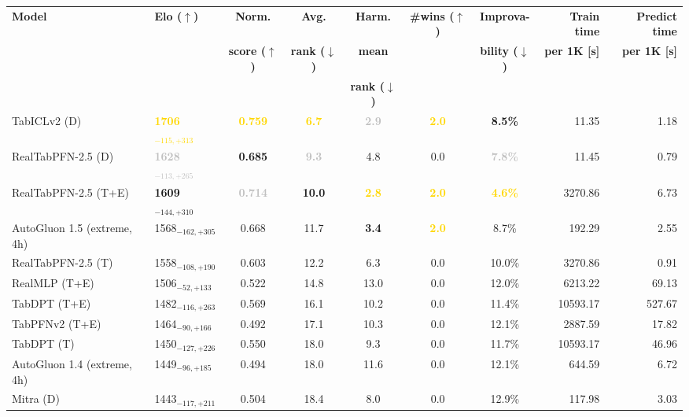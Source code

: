 \begin{tabular}{llcccccrr}
\toprule
\textbf{Model} & \textbf{Elo ($\uparrow$)} & \textbf{Norm.} & \textbf{Avg.} & \textbf{Harm.} & \textbf{\#wins ($\uparrow$)} & \textbf{Improva-} & \textbf{Train time} & \textbf{Predict time} \\
 &  & \textbf{score ($\uparrow$)} & \textbf{rank ($\downarrow$)} & \textbf{mean} &  & \textbf{bility ($\downarrow$)} & \textbf{per 1K [s]} & \textbf{per 1K [s]} \\
 &  &  &  & \textbf{rank ($\downarrow$)} &  &  &  &  \\
\midrule
TabICLv2 (D) & \textcolor{gold}{\textbf{1706${}_{-115,+313}$}} & \textcolor{gold}{\textbf{0.759}} & \textcolor{gold}{\textbf{6.7}} & \textcolor{silver}{\textbf{2.9}} & \textcolor{gold}{\textbf{2.0}} & \textcolor{bronze}{\textbf{8.5\%}} & 11.35 & 1.18 \\
RealTabPFN-2.5 (D) & \textcolor{silver}{\textbf{1628${}_{-113,+265}$}} & \textcolor{bronze}{\textbf{0.685}} & \textcolor{silver}{\textbf{9.3}} & 4.8 & 0.0 & \textcolor{silver}{\textbf{7.8\%}} & 11.45 & 0.79 \\
RealTabPFN-2.5 (T+E) & \textcolor{bronze}{\textbf{1609${}_{-144,+310}$}} & \textcolor{silver}{\textbf{0.714}} & \textcolor{bronze}{\textbf{10.0}} & \textcolor{gold}{\textbf{2.8}} & \textcolor{gold}{\textbf{2.0}} & \textcolor{gold}{\textbf{4.6\%}} & 3270.86 & 6.73 \\
AutoGluon 1.5 (extreme, 4h) & 1568${}_{-162,+305}$ & 0.668 & 11.7 & \textcolor{bronze}{\textbf{3.4}} & \textcolor{gold}{\textbf{2.0}} & 8.7\% & 192.29 & 2.55 \\
RealTabPFN-2.5 (T) & 1558${}_{-108,+190}$ & 0.603 & 12.2 & 6.3 & 0.0 & 10.0\% & 3270.86 & 0.91 \\
RealMLP (T+E) & 1506${}_{-52,+133}$ & 0.522 & 14.8 & 13.0 & 0.0 & 12.0\% & 6213.22 & 69.13 \\
TabDPT (T+E) & 1482${}_{-116,+263}$ & 0.569 & 16.1 & 10.2 & 0.0 & 11.4\% & 10593.17 & 527.67 \\
TabPFNv2 (T+E) & 1464${}_{-90,+166}$ & 0.492 & 17.1 & 10.3 & 0.0 & 12.1\% & 2887.59 & 17.82 \\
TabDPT (T) & 1450${}_{-127,+226}$ & 0.550 & 18.0 & 9.3 & 0.0 & 11.7\% & 10593.17 & 46.96 \\
AutoGluon 1.4 (extreme, 4h) & 1449${}_{-96,+185}$ & 0.494 & 18.0 & 11.6 & 0.0 & 12.1\% & 644.59 & 6.72 \\
Mitra (D) & 1443${}_{-117,+211}$ & 0.504 & 18.4 & 8.0 & 0.0 & 12.9\% & 117.98 & 3.03 \\

\end{tabular}
